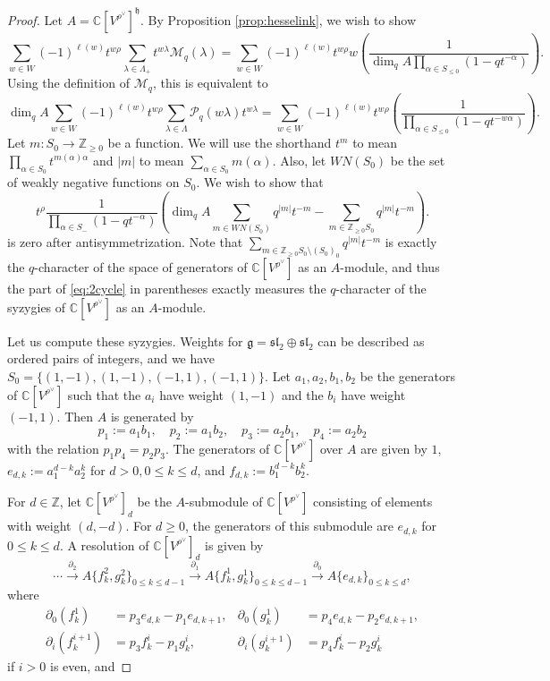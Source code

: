 \documentclass[12pt]{article}
\newcommand{\Z}{\mathbb{Z}}
\newcommand{\C}{\mathbb{C}}
\renewcommand{\sl}{\mathfrak{sl}}
\newcommand{\xto}[1]{\xrightarrow{#1}}
\theoremstyle{definition}
\theoremstyle{remark}
\newcommand{\g}{\mathfrak{g}}
\renewcommand{\P}{\mathcal{P}}
\newcommand{\M}{\mathcal{M}}
\newcommand{\h}{\mathfrak{h}}
\begin{document}
\begin{proof}
    Let $A=\C[V^{\rho^\vee}]^\h$. By Proposition \ref{prop:hesselink}, we wish to show
    \[\sum_{w\in W}(-1)^{\ell(w)}t^{w\rho}\sum_{\lambda\in\Lambda_+}t^{w\lambda}\M_q(\lambda)=\sum_{w\in W}(-1)^{\ell(w)}t^{w\rho}w\left(\frac{1}{\dim_qA\prod_{\alpha\in S_{\leq 0}}(1-qt^{-\alpha})}\right).\]
    Using the definition of $\M_q$, this is equivalent to
    \[\dim_qA\sum_{w\in W}(-1)^{\ell(w)}t^{w\rho}\sum_{\lambda\in\Lambda}\P_q(w\lambda)t^{w\lambda}=\sum_{w\in W}(-1)^{\ell(w)}t^{w\rho}\left(\frac{1}{\prod_{\alpha\in S_{\leq 0}}(1-qt^{-w\alpha})}\right).\]
    Let $m:S_0\to\Z_{\geq 0}$ be a function. We will use the shorthand $t^m$ to mean $\prod_{\alpha\in S_0}t^{m(\alpha)\alpha}$ and $|m|$ to mean $\sum_{\alpha\in S_0}m(\alpha)$. Also, let $WN(S_0)$ be the set of weakly negative functions on $S_0$. We wish to show that
    \begin{equation}\label{eq:2cycle}
        t^\rho\frac{1}{\prod_{\alpha\in S_-}(1-qt^{-\alpha})}\left(\dim_qA\sum_{m\in WN(S_0)}q^{|m|}t^{-m}-\sum_{m\in\Z_{\geq 0}S_0}q^{|m|}t^{-m}\right).
    \end{equation}
    is zero after antisymmetrization. Note that $\sum_{m\in\Z_{\geq 0}S_0\setminus(S_0)_0}q^{|m|}t^{-m}$ is exactly the $q$-character of the space of generators of $\C[V^{\rho^\vee}]$ as an $A$-module, and thus the part of \eqref{eq:2cycle} in parentheses exactly measures the $q$-character of the syzygies of $\C[V^{\rho^\vee}]$ as an $A$-module.

    Let us compute these syzygies. Weights for $\g=\sl_2\oplus\sl_2$ can be described as ordered pairs of integers, and we have $S_0=\{(1,-1),(1,-1),(-1,1),(-1,1)\}$. Let $a_1,a_2,b_1,b_2$ be the generators of $\C[V^{\rho^\vee}]$ such that the $a_i$ have weight $(1,-1)$ and the $b_i$ have weight $(-1,1)$. Then $A$ is generated by
    \[p_1:=a_1b_1,\quad p_2:=a_1b_2,\quad p_3:=a_2b_1,\quad p_4:=a_2b_2\]
    with the relation $p_1p_4=p_2p_3$. The generators of $\C[V^{\rho^\vee}]$ over $A$ are given by $1$, $e_{d,k}:=a_1^{d-k}a_2^k$ for $d>0,0\leq k\leq d$, and $f_{d,k}:=b_1^{d-k}b_2^k$. 

    For $d\in\Z$, let $\C[V^{\rho^\vee}]_d$ be the $A$-submodule of $\C[V^{\rho^\vee}]$ consisting of elements with weight $(d,-d)$. For $d\geq 0$, the generators of this submodule are $e_{d,k}$ for $0\leq k\leq d$. A resolution of $\C[V^{\rho^\vee}]_d$ is given by
    \[\cdots\xto{\partial_2}A\{f^2_k,g^2_k\}_{0\leq k\leq d-1}\xto{\partial_1}A\{f^1_k,g^1_k\}_{0\leq k\leq d-1}\xto{\partial_0}A\{e_{d,k}\}_{0\leq k\leq d},\]
    where
    \begin{align*}
        \partial_0(f_k^1)&=p_3e_{d,k}-p_1e_{d,k+1},&\partial_0(g_k^1)&=p_4e_{d,k}-p_2e_{d,k+1},\\
        \partial_i(f_k^{i+1})&=p_3f_k^i-p_1g_k^i,&\partial_i(g_k^{i+1})&=p_4f_k^i-p_2g_k^i
    \end{align*}
    if $i>0$ is even, and
    

\end{proof}
\end{document}
